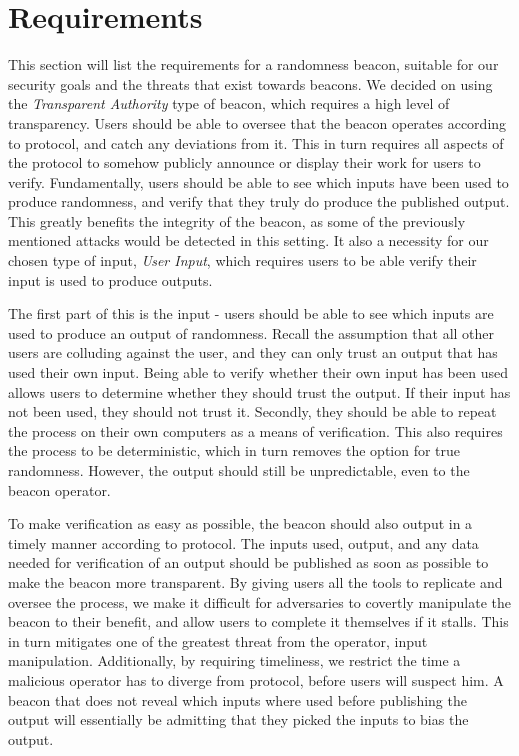\section{Requirements}
\label{sec:beacon_requirements}

This section will list the requirements for a randomness beacon, suitable for our security goals and the threats that exist towards beacons.
We decided on using the \emph{Transparent Authority} type of beacon, which requires a high level of transparency. Users should be able to oversee that the beacon operates according to protocol, and catch any deviations from it. This in turn requires all aspects of the protocol to somehow publicly announce or display their work for users to verify. Fundamentally, users should be able to see which inputs have been used to produce randomness, and verify that they truly do produce the published output. This greatly benefits the integrity of the beacon, as some of the previously mentioned attacks would be detected in this setting. It also a necessity for our chosen type of input, \emph{User Input}, which requires users to be able verify their input is used to produce outputs.

The first part of this is the input - users should be able to see which inputs are used to produce an output of randomness. Recall the assumption that all other users are colluding against the user, and they can only trust an output that has used their own input.
Being able to verify whether their own input has been used allows users to determine whether they should trust the output. If their input has not been used, they should not trust it.
Secondly, they should be able to repeat the process on their own computers as a means of verification. This also requires the process to be deterministic, which in turn removes the option for true randomness. However, the output should still be unpredictable, even to the beacon operator.

To make verification as easy as possible, the beacon should also output in a timely manner according to protocol. The inputs used, output, and any data needed for verification of an output should be published as soon as possible to make the beacon more transparent. By giving users all the tools to replicate and oversee the process, we make it difficult for adversaries to covertly manipulate the beacon to their benefit, and allow users to complete it themselves if it stalls. This in turn mitigates one of the greatest threat from the operator, input manipulation.
Additionally, by requiring timeliness, we restrict the time a malicious operator has to diverge from protocol, before users will suspect him. A beacon that does not reveal which inputs where used before publishing the output will essentially be admitting that they picked the inputs to bias the output.

